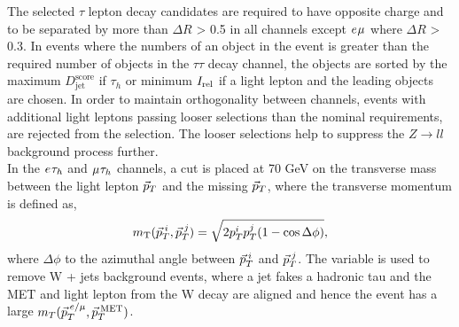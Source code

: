 The selected $\tau$ lepton decay candidates are required to have opposite charge and to be separated by more than $\Delta R$ > 0.5 in all channels except $e_{}\mu_{}$ where $\Delta R$ > 0.3.
In events where the numbers of an object in the event is greater than the required number of objects in the $\tau\tau$ decay channel, the objects are sorted by the maximum $D_{\text{jet}}^{\text{score}}$ if $\tau_h$ or minimum $I_{\text{rel}}$ if a light lepton and the leading objects are chosen.
In order to maintain orthogonality between channels, events with additional light leptons passing looser selections than the nominal requirements, are rejected from the selection.
The looser selections help to suppress the $Z \rightarrow ll$ background process further. \\

In the $e_{}\tau_{h}$ and $\mu_{}\tau_{h}$ channels, a cut is placed at 70 GeV on the transverse mass between the light lepton $\vec{p}_{T}$ and the missing $\vec{p}_{T}$, where the transverse momentum is defined as,
\begin{equation}
m_{\text{T}}(\vec{p}_{T}^{\hspace{2pt}i},\vec{p}_{T}^{\hspace{2pt}j}) = \sqrt{2p_{T}^{i}p_{T}^{j}(1-\cos\Delta\phi)},
\end{equation}
where $\Delta\phi$ to the azimuthal angle between $\vec{p}_{T}^{\hspace{2pt}i}$ and $\vec{p}_{T}^{\hspace{2pt}j}$.
The variable is used to remove W + jets background events, where a jet fakes a hadronic tau and the MET and light lepton from the W decay are aligned and hence the event has a large $m_{T}(\vec{p}_{T}^{\hspace{2pt}e/\mu},\vec{p}_{T}^{\hspace{2pt}\text{MET}})$.

